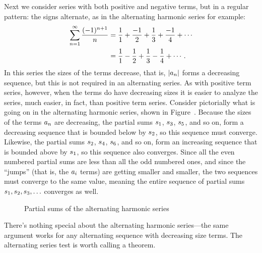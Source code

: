 \nobreak
Next we consider series with both positive and negative terms, but in
a regular pattern: the signs alternate, as in the {\dfont alternating
  harmonic series%
%
\/} for example:
\begin{align*}
  \sum_{n=1}^\infty {(-1)^{n+1}\over n}
  &={1\over1}+{-1\over2}+{1\over3}+{-1\over4}+\cdots \\
  &= {1\over1}-{1\over2}+{1\over3}-{1\over4}+\cdots.
\end{align*}
In this series the sizes of the terms decrease, that is, 
$\displaystyle |a_n|$ forms a decreasing sequence, but this is not required in an
alternating series. As with positive term series, however, when the
terms do have decreasing sizes it is easier to analyze the series,
much easier, in fact, than positive term series. Consider pictorially
what is going on in the alternating harmonic series, shown in
Figure~. Because the sizes of
the terms $\displaystyle a_n$ are decreasing, the partial sums $\displaystyle s_1$, $\displaystyle s_3$, $\displaystyle s_5$,
and so on, form a decreasing sequence that is bounded below by
$\displaystyle s_2$, so this sequence must converge.
Likewise, the partial sums $\displaystyle s_2$, $\displaystyle s_4$, $\displaystyle s_6$,
and so on, form an increasing sequence that is bounded above by
$\displaystyle s_1$, so this sequence also converges. Since all the even numbered
partial sums are less than all the odd numbered ones, and since the
``jumps'' (that is, the $\displaystyle a_i$ terms) are getting smaller and smaller,
the two sequences must converge to the same value, meaning the entire
sequence of partial sums $\displaystyle s_1,s_2,s_3,\ldots$ converges as well.

\begin{fullwidth}
\begin{figure}[!h]
\vspace{12pt}

\label{fig:alternating-harmonic-series}
\caption{Partial sums of the alternating harmonic series}
\end{figure}
\end{fullwidth}

There's nothing special about the alternating harmonic series---the
same argument works for any alternating sequence with decreasing size
terms. The alternating series test is worth calling a theorem.

